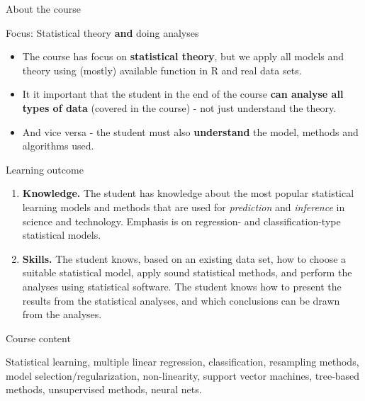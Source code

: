 \documentclass[ignorenonframetext,]{beamer}
\begin{document}
\begin{frame}{About the course}

\begin{block}{Focus: Statistical theory \textbf{and} doing analyses}

\begin{itemize}
\item
  The course has focus on \textbf{statistical theory}, but we apply all
  models and theory using (mostly) available function in R and real data
  sets.
\item
  It it important that the student in the end of the course \textbf{can
  analyse all types of data} (covered in the course) - not just
  understand the theory.
\item
  And vice versa - the student must also \textbf{understand} the model,
  methods and algorithms used.
\end{itemize}

\end{block}

\end{frame}

\begin{frame}

\begin{block}{Learning outcome}

\begin{enumerate}
\def\labelenumi{\arabic{enumi}.}
\item
  \textbf{Knowledge.} The student has knowledge about the most popular
  statistical learning models and methods that are used for
  \emph{prediction} and \emph{inference} in science and technology.
  Emphasis is on regression- and classification-type statistical models.
\item
  \textbf{Skills.} The student knows, based on an existing data set, how
  to choose a suitable statistical model, apply sound statistical
  methods, and perform the analyses using statistical software. The
  student knows how to present the results from the statistical
  analyses, and which conclusions can be drawn from the analyses.
\end{enumerate}

\end{block}

\end{frame}

\begin{frame}

\begin{block}{Course content}

Statistical learning, multiple linear regression, classification,
resampling methods, model selection/regularization, non-linearity,
support vector machines, tree-based methods, unsupervised methods,
neural nets.

\end{block}

\end{frame}
\end{document}
